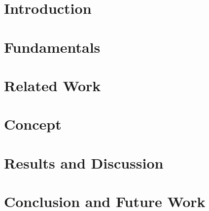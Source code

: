 \documentclass[oneside,11pt,a4paper,twoside]{scrreprt}
\begin{document}
\begin{onehalfspace}
\chapter{Introduction}\label{sec:introduction}
  
  \cleardoublepage
\chapter{Fundamentals}\label{sec:fundamentals}
  
  \cleardoublepage
\chapter{Related Work}\label{sec:relatedwork}
  
  \cleardoublepage
\chapter{Concept}\label{sec:concept}
  
  \cleardoublepage
\chapter{Results and Discussion}\label{sec:resultsanddiscussion}
  
  \cleardoublepage
\chapter{Conclusion and Future Work}\label{sec:conclusionandfuturework}
  
  \cleardoublepage
\end{onehalfspace}
\printbibliography[title={References},heading=bibintoc]
\cleardoublepage
\small\normalsize
{}
\listoffigures
\small\normalsize
\cleardoublepage
\small\normalsize
{}
\end{document}
